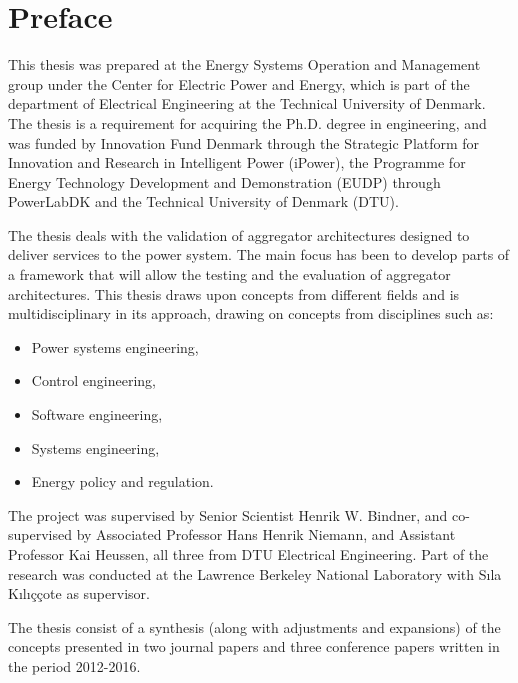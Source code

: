 \chapter{Preface}
This thesis was prepared at the Energy Systems Operation and Management group under the Center for Electric Power and Energy, which is part of the department of Electrical Engineering at the Technical University of Denmark. The thesis is a requirement for acquiring the Ph.D. degree in engineering, and was funded by Innovation Fund Denmark through the Strategic Platform for Innovation and Research in Intelligent Power (iPower), the Programme for Energy Technology Development and Demonstration (EUDP) through PowerLabDK and the Technical University of Denmark (DTU).

The thesis deals with the validation of aggregator architectures designed to deliver services to the power system. The main focus has been to develop parts of a framework that will allow the testing and the evaluation of aggregator architectures.
This thesis draws upon concepts from different fields and is multidisciplinary in its approach, drawing on concepts from disciplines such as:
\begin{itemize}
	\item Power systems engineering,
	\item Control engineering,
	\item Software engineering,
	\item Systems engineering,
	\item Energy policy and regulation.
\end{itemize}

The project was supervised by Senior Scientist Henrik W. Bindner, and co-supervised by Associated Professor Hans Henrik Niemann, and Assistant Professor Kai Heussen, all three from DTU Electrical Engineering. Part of the research was conducted at the Lawrence Berkeley National Laboratory with S{\i}la K{\i}l{\i}\c{c}\c{c}ote as supervisor.

The thesis consist of a synthesis (along with adjustments and expansions) of the concepts presented in two journal papers and three conference papers written in the period 2012-2016.
\vfill

{
\centering
\begin{flushright}
    \thesisauthor{}
\end{flushright}
}
